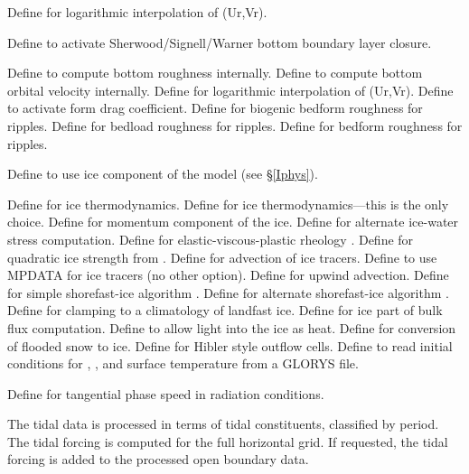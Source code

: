 \begin{klist}
\begin{klist}
\begin{klist}
          Define for logarithmic interpolation of
     (Ur,Vr).
      \end{klist}
       Define to activate Sherwood/Signell/Warner bottom
    boundary layer closure.
      \begin{klist}
         Define to compute bottom roughness
     internally.
         Define to compute bottom orbital velocity
    internally.
          Define for logarithmic interpolation of
     (Ur,Vr).
         Define to activate form drag
     coefficient.
         Define for biogenic bedform roughness for
    ripples.
         Define for bedload roughness for ripples.
         Define for bedform roughness for ripples.
      \end{klist}
  \end{klist}
  \mbox{}
    \begin{klist}
    Define to use ice component of the model (see
    \S\ref{Iphys}).
      \begin{klist}
         Define for ice thermodynamics.
         Define for \citet{Mellor89}
	ice thermodynamics---this is the only choice.
	 Define for momentum component of the ice.
	 Define for alternate ice-water stress
	computation.
	 Define for elastic-viscous-plastic rheology
	  \citep{Hunke97, Hunke_2001}.
	 Define for quadratic ice
   	  strength from \citet{Overland_1988}.
	 Define for advection of ice tracers.
	 Define to use MPDATA for ice tracers (no
	other option).
	 Define for upwind advection.
	 Define for simple shorefast-ice
	algorithm \citep{Budgell05}.
	 Define for alternate shorefast-ice
	algorithm \citep{Lemieux_2015}.
	 Define for clamping to a
	climatology of landfast ice.
	 Define for ice part of bulk flux
	  computation.
	 Define to allow light into the ice as heat.
	 Define for conversion of flooded snow
 	  to ice.
	 Define for Hibler style outflow cells.
	 Define to read initial conditions
	for , , and surface temperature from a
	GLORYS file.
      \end{klist}
  \end{klist}
   \mbox{}
  \begin{klist}
       Define for tangential phase speed in
     radiation conditions.
  \end{klist}
   \mbox{}
The tidal data is processed in terms of tidal constituents, classified by
period. The tidal forcing is computed for the full horizontal grid.
If requested, the tidal forcing is added to the processed open
boundary data.


\end{klist}

